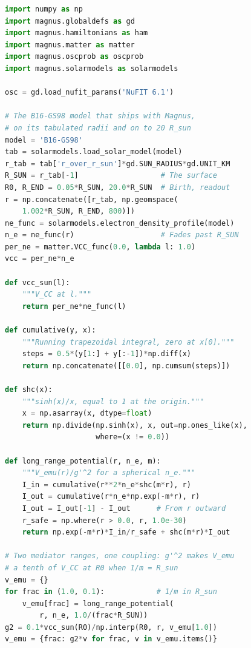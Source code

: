 \documentclass[final,5p,times,twocolumn,sort,compress]{elsarticle}
\makeatletter
\newcommand{\eq}{Eq.}
\newcommand{\fig}{Fig.}
\DeclareRobustCommand{\_}{%
  \ifmmode\nfss@text{\textunderscore}\else\textunderscore\allowbreak\fi}
\newcommand{\equ}[1]{\eq~(\ref{equ:#1})}
\newcommand{\figu}[1]{\fig~\ref{fig:#1}}
\makeatother
\begin{document}
\begin{lstlisting}[language=Python, caption={\textbf{A long-range force in the Sun.} Computing \figu{solar_lri}. The electron density comes from the B16-GS98 model\ \cite{Vinyoles:2016djt}. The potential $V_{e\mu}$ is \equ{yukawa_1d} on that profile. The neutrino is born at $0.05\,R_\odot$, and the probability, \equ{averaged_varying}, is read at $20\,R_\odot$. See notebooks \#19 and \#28, and Sec.~\ref{sec:lri_sun} for details.}, label={lst:arbitrary}, float=tbp]
import numpy as np
import magnus.globaldefs as gd
import magnus.hamiltonians as ham
import magnus.matter as matter
import magnus.oscprob as oscprob
import magnus.solarmodels as solarmodels

osc = gd.load_nufit_params('NuFIT 6.1')

# The B16-GS98 model that ships with Magnus,
# on its tabulated radii and on to 20 R_sun
model = 'B16-GS98'
tab = solarmodels.load_solar_model(model)
r_tab = tab['r_over_r_sun']*gd.SUN_RADIUS*gd.UNIT_KM
R_SUN = r_tab[-1]                   # The surface
R0, R_END = 0.05*R_SUN, 20.0*R_SUN  # Birth, readout
r = np.concatenate([r_tab, np.geomspace(
    1.002*R_SUN, R_END, 800)])
ne_func = solarmodels.electron_density_profile(model)
n_e = ne_func(r)                    # Fades past R_SUN
per_ne = matter.VCC_func(0.0, lambda l: 1.0)
vcc = per_ne*n_e

def vcc_sun(l):
    """V_CC at l."""
    return per_ne*ne_func(l)

def cumulative(y, x):
    """Running trapezoidal integral, zero at x[0]."""
    steps = 0.5*(y[1:] + y[:-1])*np.diff(x)
    return np.concatenate([[0.0], np.cumsum(steps)])

def shc(x):
    """sinh(x)/x, equal to 1 at the origin."""
    x = np.asarray(x, dtype=float)
    return np.divide(np.sinh(x), x, out=np.ones_like(x),
                     where=(x != 0.0))

def long_range_potential(r, n_e, m):
    """V_emu(r)/g'^2 for a spherical n_e."""
    I_in = cumulative(r**2*n_e*shc(m*r), r)
    I_out = cumulative(r*n_e*np.exp(-m*r), r)
    I_out = I_out[-1] - I_out      # From r outward
    r_safe = np.where(r > 0.0, r, 1.0e-30)
    return np.exp(-m*r)*I_in/r_safe + shc(m*r)*I_out

# Two mediator ranges, one coupling: g'^2 makes V_emu
# a tenth of V_CC at R0 when 1/m = R_sun
v_emu = {}
for frac in (1.0, 0.1):            # 1/m in R_sun
    v_emu[frac] = long_range_potential(
        r, n_e, 1.0/(frac*R_SUN))
g2 = 0.1*vcc_sun(R0)/np.interp(R0, r, v_emu[1.0])
v_emu = {frac: g2*v for frac, v in v_emu.items()}


\end{lstlisting}
\end{document}
